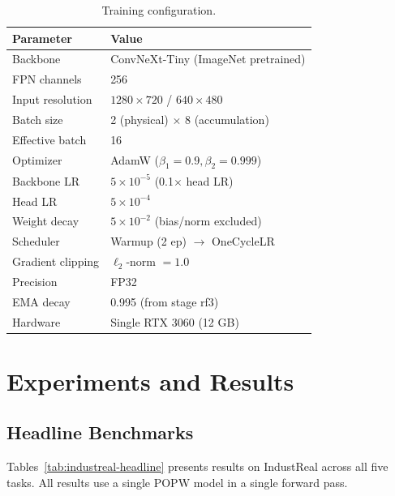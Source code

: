 \documentclass[10pt,twocolumn]{article}
\newcommand{\popw}{POPW}
\begin{document}
\begin{table}[htbp]
\centering
\small
\caption{Training configuration.}
\label{tab:training-config}
\begin{tabular}{l l}
\toprule
\textbf{Parameter} & \textbf{Value} \\
\midrule
Backbone & ConvNeXt-Tiny (ImageNet pretrained) \\
FPN channels & 256 \\
Input resolution & $1280 \times 720$ / $640 \times 480$ \\
Batch size & 2 (physical) $\times$ 8 (accumulation) \\
Effective batch & 16 \\
Optimizer & AdamW ($\beta_1{=}0.9, \beta_2{=}0.999$) \\
Backbone LR & $5 \times 10^{-5}$ (0.1$\times$ head LR) \\
Head LR & $5 \times 10^{-4}$ \\
Weight decay & $5 \times 10^{-2}$ (bias/norm excluded) \\
Scheduler & Warmup (2 ep) $\rightarrow$ OneCycleLR \\
Gradient clipping & $\ell_2$-norm $= 1.0$ \\
Precision & FP32 \\
EMA decay & 0.995 (from stage rf3) \\
Hardware & Single RTX 3060 (12 GB) \\
\bottomrule
\end{tabular}
\end{table}

\section{Experiments and Results}
\label{sec:experiments}

\subsection{Headline Benchmarks}

Tables~\ref{tab:industreal-headline} presents results on IndustReal across all five tasks. All results use a single \popw{} model in a single forward pass.
\end{document}
